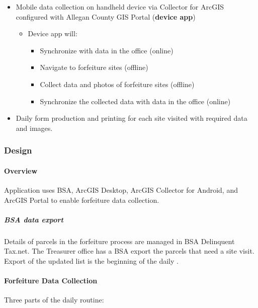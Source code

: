 \documentclass[class=article , crop=false, titlepage, twoside, multi={itemize, figure, verbatim}, float=false]{standalone}
\begin{document}
\begin{itemize} %

\item Mobile data collection on handheld device via Collector for ArcGIS configured with Allegan County GIS Portal  (\textbf{device app})

\begin{itemize} %

\item Device app will:

\begin{itemize} %

\item Synchronize with data in the office (online)
\item Navigate to forfeiture sites (offline)
\item Collect data and photos of forfeiture sites (offline)
\item Synchronize the collected data with data in the office (online)
\end{itemize} %

\end{itemize} %

\item Daily form production and printing for each site visited with required data and images.

\end{itemize} %

\clearpage
\subsubsection{Design}

\paragraph{Overview}Application uses BSA, ArcGIS Desktop, ArcGIS Collector for Android, and ArcGIS Portal to enable forfeiture data collection.

\subparagraph{BSA data export}Details of parcels in the forfeiture process are managed in BSA Delinquent Tax.net.  The Treasurer office has a BSA export the parcels that need a site visit.  Export of the updated list is the beginning of the daily .

\paragraph{Forfeiture Data Collection}
Three parts of the daily routine:
\end{document}
